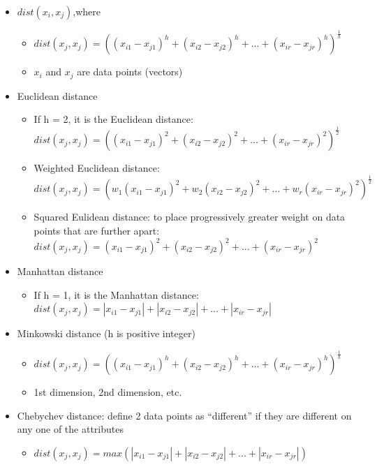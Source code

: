 \documentclass[
]{book}
\providecommand{\tightlist}{%
  \setlength{\itemsep}{0pt}\setlength{\parskip}{0pt}}
\begin{document}
\begin{itemize}
\item
  \(dist(x_i, x_j)\),where

  \begin{itemize}
  \tightlist
  \item
    \(dist(x_j, x_j) = ((x_{i1} - x_{j1})^h + (x_{i2} - x_{j2})^h + ... + (x_{ir} - x_{jr})^h)^{\frac{1}{h}}\)
  \item
    \(x_i\) and \(x_j\) are data points (vectors)\\
  \end{itemize}
\item
  Euclidean distance

  \begin{itemize}
  \tightlist
  \item
    If h = 2, it is the Euclidean distance: \(dist(x_j, x_j) = ((x_{i1} - x_{j1})^2 + (x_{i2} - x_{j2})^2 + ... + (x_{ir} - x_{jr})^2)^{\frac{1}{2}}\)
  \item
    Weighted Euclidean distance: \(dist(x_j, x_j) = (w_1(x_{i1} - x_{j1})^2 + w_2(x_{i2} - x_{j2})^2 + ... + w_r(x_{ir} - x_{jr})^2)^{\frac{1}{2}}\)
  \item
    Squared Eulidean distance: to place progressively greater weight on data points that are further apart: \(dist(x_j, x_j) = (x_{i1} - x_{j1})^2 + (x_{i2} - x_{j2})^2 + ... + (x_{ir} - x_{jr})^2\)
  \end{itemize}
\item
  Manhattan distance

  \begin{itemize}
  \tightlist
  \item
    If h = 1, it is the Manhattan distance: \(dist(x_j, x_j) = |x_{i1} - x_{j1}| + |x_{i2} - x_{j2}| + ... + |x_{ir} - x_{jr}|\)
  \end{itemize}
\item
  Minkowski distance (h is positive integer)

  \begin{itemize}
  \tightlist
  \item
    \(dist(x_j, x_j) = ((x_{i1} - x_{j1})^h + (x_{i2} - x_{j2})^h + ... + (x_{ir} - x_{jr})^h)^{\frac{1}{h}}\)
  \item
    1st dimension, 2nd dimension, etc.\\
  \end{itemize}
\item
  Chebychev distance: define 2 data points as ``different'' if they are different on any one of the attributes

  \begin{itemize}
  \tightlist
  \item
    \(dist(x_j, x_j) = max(|x_{i1} - x_{j1}| + |x_{i2} - x_{j2}| + ... + |x_{ir} - x_{jr}|)\)
  \end{itemize}
\end{itemize}
\end{document}
